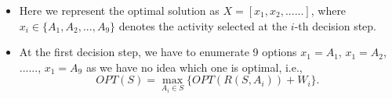 \documentclass[mathserif]{beamer}
\begin{document}
{\begin{figure}
\end{figure}

\begin{itemize}
	\item Here we represent the optimal solution as $X=[x_1, x_2, ......]$, where $x_i\in \{A_1, A_2, ..., A_9\}$ denotes the activity selected at the $i$-th decision step. 
	\item At the first decision step, we have to enumerate 9 options $x_1 = A_1$, $x_1 = A_2$, ......, $x_1 = A_9$ as we have no idea which one is optimal, i.e.,  
\[
OPT(S) = \max_{A_i \in S}\{OPT( R(S, A_i) ) + W_i\}.
\]

\end{itemize}

}


\end{document}
